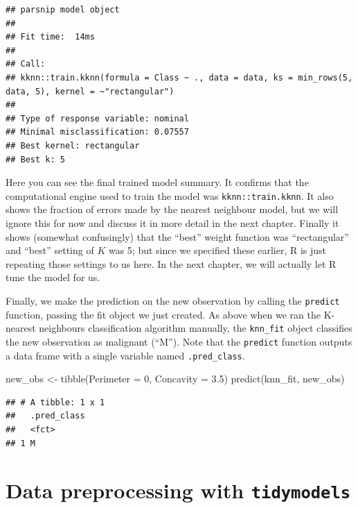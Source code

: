 \documentclass[
]{krantz}
\makeatletter
\newenvironment{Shaded}{\begin{snugshade}}{\end{snugshade}}
\newcommand{\AttributeTok}[1]{\textcolor[rgb]{0.61,0.61,0.61}{#1}}
\newcommand{\DecValTok}[1]{\textcolor[rgb]{0.06,0.06,0.06}{#1}}
\newcommand{\FloatTok}[1]{\textcolor[rgb]{0.06,0.06,0.06}{#1}}
\newcommand{\FunctionTok}[1]{\textcolor[rgb]{0,0,0}{#1}}
\newcommand{\NormalTok}[1]{#1}
\newcommand{\OtherTok}[1]{\textcolor[rgb]{0.37,0.37,0.37}{#1}}
\newenvironment{kframe}{%
\medskip{}
\setlength{\fboxsep}{.8em}
 \def\at@end@of@kframe{}%
 \ifinner\ifhmode%
  \def\at@end@of@kframe{\end{minipage}}%
  \begin{minipage}{\columnwidth}%
 \fi\fi%
 \def\FrameCommand##1{\hskip\@totalleftmargin \hskip-\fboxsep
 \colorbox{shadecolor}{##1}\hskip-\fboxsep
     \hskip-\linewidth \hskip-\@totalleftmargin \hskip\columnwidth}%
 \MakeFramed {\advance\hsize-\width
   \@totalleftmargin\z@ \linewidth\hsize
   \@setminipage}}%
 {\par\unskip\endMakeFramed%
 \at@end@of@kframe}
\renewenvironment{Shaded}{\begin{kframe}}{\end{kframe}}
\makeatother
\begin{document}
\begin{verbatim}
## parsnip model object
## 
## Fit time:  14ms 
## 
## Call:
## kknn::train.kknn(formula = Class ~ ., data = data, ks = min_rows(5,     data, 5), kernel = ~"rectangular")
## 
## Type of response variable: nominal
## Minimal misclassification: 0.07557
## Best kernel: rectangular
## Best k: 5
\end{verbatim}

Here you can see the final trained model summary. It confirms that the computational engine used
to train the model was \texttt{kknn::train.kknn}. It also shows the fraction of errors made by
the nearest neighbour model, but we will ignore this for now and discuss it in more detail
in the next chapter.
Finally it shows (somewhat confusingly) that the ``best'' weight function
was ``rectangular'' and ``best'' setting of \(K\) was 5; but since we specified these earlier,
R is just repeating those settings to us here. In the next chapter, we will actually
let R tune the model for us.

Finally, we make the prediction on the new observation by calling the \texttt{predict} function,
passing the fit object we just created. As above when we ran the K-nearest neighbours
classification algorithm manually, the \texttt{knn\_fit} object classifies the new observation as
malignant (``M''). Note that the \texttt{predict} function outputs a data frame with a single
variable named \texttt{.pred\_class}.

\begin{Shaded}
\begin{Highlighting}[]
\NormalTok{new\_obs }\OtherTok{\textless{}{-}} \FunctionTok{tibble}\NormalTok{(}\AttributeTok{Perimeter =} \DecValTok{0}\NormalTok{, }\AttributeTok{Concavity =} \FloatTok{3.5}\NormalTok{)}
\FunctionTok{predict}\NormalTok{(knn\_fit, new\_obs)}
\end{Highlighting}
\end{Shaded}

\begin{verbatim}
## # A tibble: 1 x 1
##   .pred_class
##   <fct>      
## 1 M
\end{verbatim}

\hypertarget{data-preprocessing-with-tidymodels}{%
\section{\texorpdfstring{Data preprocessing with \texttt{tidymodels}}{Data preprocessing with tidymodels}}\label{data-preprocessing-with-tidymodels}}
\end{document}
